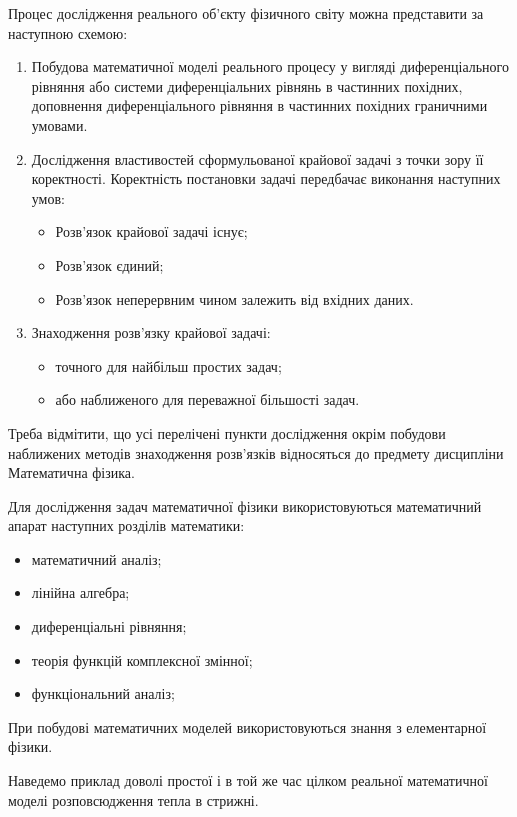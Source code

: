 Процес дослідження реального об'єкту фізичного світу можна представити за наступною схемою:
\begin{enumerate}
	\item Побудова математичної моделі реального процесу у вигляді диференціального рівняння або системи диференціальних рівнянь в частинних похідних, доповнення диференціального рівняння в частинних похідних граничними умовами.
	\item Дослідження властивостей сформульованої крайової задачі з точки зору її коректності. Коректність постановки задачі передбачає виконання наступних умов:
	\begin{itemize}
		\item Розв'язок крайової задачі існує;
		\item Розв'язок єдиний;
		\item Розв'язок неперервним чином залежить від вхідних даних.
	\end{itemize}
	\item Знаходження розв'язку крайової задачі: 
	\begin{itemize}
		\item точного для найбільш простих задач;
		\item або наближеного для переважної більшості задач.
	\end{itemize}
\end{enumerate}

Треба відмітити, що усі перелічені пункти дослідження окрім побудови наближених методів знаходження розв'язків відносяться до предмету дисципліни Математична фізика. \medskip

Для дослідження задач математичної фізики використовуються математичний апарат наступних розділів математики:
\begin{itemize}
	\item математичний аналіз;
	\item лінійна алгебра;
	\item диференціальні рівняння;
	\item теорія функцій комплексної змінної;
	\item функціональний аналіз;
\end{itemize}

При побудові математичних моделей використовуються знання з елементарної фізики. \medskip

Наведемо приклад доволі простої і в той же час цілком реальної математичної моделі розповсюдження тепла в стрижні.

